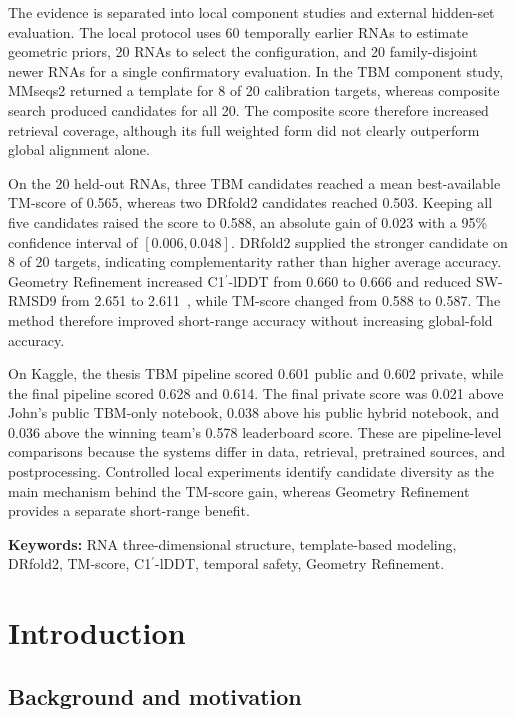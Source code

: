 \documentclass[12pt,a4paper,oneside]{report}
\newcommand{\cprime}{C1$^{\prime}$}
\newcommand{\angstrom}{\text{\AA}}
\begin{document}
The evidence is separated into local component studies and external hidden-set
evaluation. The local protocol uses 60 temporally earlier RNAs to estimate geometric
priors, 20 RNAs to select the configuration, and 20 family-disjoint newer RNAs for a
single confirmatory evaluation. In the TBM component study, MMseqs2 returned a template
for 8 of 20 calibration targets, whereas composite search produced candidates for all
20. The composite score therefore increased retrieval coverage, although its full
weighted form did not clearly outperform global alignment alone.

On the 20 held-out RNAs, three TBM candidates reached a mean best-available TM-score of
0.565, whereas two DRfold2 candidates reached 0.503. Keeping all five candidates raised
the score to 0.588, an absolute gain of $0.023$ with a 95\% confidence interval of
$[0.006,0.048]$. DRfold2 supplied the stronger candidate on 8 of 20 targets, indicating
complementarity rather than higher average accuracy. Geometry Refinement increased
\cprime{}-lDDT from 0.660 to 0.666 and reduced SW-RMSD9 from 2.651 to
2.611~\angstrom{}, while TM-score changed from 0.588 to 0.587. The method therefore
improved short-range accuracy without increasing global-fold accuracy.

On Kaggle, the thesis TBM pipeline scored 0.601 public and 0.602 private, while the final
pipeline scored 0.628 and 0.614. The final private score was 0.021 above John's public
TBM-only notebook, 0.038 above his public hybrid notebook, and 0.036 above the winning
team's 0.578 leaderboard score. These are pipeline-level comparisons because the systems
differ in data, retrieval, pretrained sources, and postprocessing. Controlled local
experiments identify candidate diversity as the main mechanism behind the TM-score gain,
whereas Geometry Refinement provides a separate short-range benefit.

\noindent\textbf{Keywords:} RNA three-dimensional structure, template-based modeling,
DRfold2, TM-score, \cprime{}-lDDT, temporal safety, Geometry Refinement.

\tableofcontents
\listoftables
\listoffigures
\clearpage
{}

\chapter{Introduction}
\label{chap:intro_en}

\section{Background and motivation}
\end{document}

